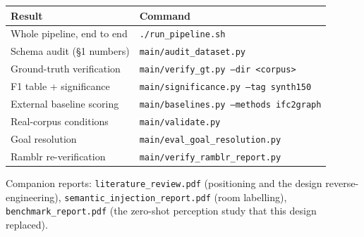 \documentclass[11pt,a4paper]{article}
\begin{document}
\begin{center}
\small
\begin{tabular}{ll}
\toprule
\textbf{Result} & \textbf{Command} \\
\midrule
Whole pipeline, end to end     & \texttt{./run\_pipeline.sh} \\
Schema audit (\S1 numbers)     & \texttt{main/audit\_dataset.py} \\
Ground-truth verification      & \texttt{main/verify\_gt.py --dir <corpus>} \\
F1 table + significance        & \texttt{main/significance.py --tag synth150} \\
External baseline scoring      & \texttt{main/baselines.py --methods ifc2graph} \\
Real-corpus conditions         & \texttt{main/validate.py} \\
Goal resolution                & \texttt{main/eval\_goal\_resolution.py} \\
Ramblr re-verification         & \texttt{main/verify\_ramblr\_report.py} \\
\bottomrule
\end{tabular}
\end{center}

\noindent
Companion reports: \texttt{literature\_review.pdf} (positioning and the design
reverse-engineering), \texttt{semantic\_injection\_report.pdf} (room labelling),
\texttt{benchmark\_report.pdf} (the zero-shot perception study that this design
replaced).
\end{document}
